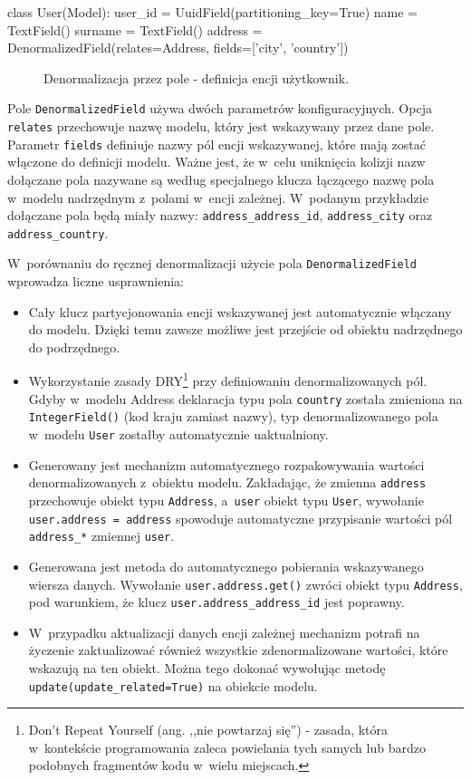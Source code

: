\begin{verbbox}[\footnotesize]
class User(Model):
    user_id = UuidField(partitioning_key=True)
    name = TextField()
    surname = TextField()
    address = DenormalizedField(relates=Address, 
                                fields=['city', 'country'])
\end{verbbox}

\begin{figure}[ht!]
	\centering
	\theverbbox
	\caption{Denormalizacja przez pole - definicja encji użytkownik.}
	\label{lst:denormalization_by_field_example}
\end{figure}

Pole \verb+DenormalizedField+ używa dwóch parametrów konfiguracyjnych. Opcja \verb+relates+ przechowuje nazwę modelu, który jest wskazywany przez dane pole. Parametr \verb+fields+ definiuje nazwy pól encji wskazywanej, które mają zostać włączone do definicji modelu. Ważne jest, że w~celu uniknięcia kolizji nazw dołączane pola nazywane są według specjalnego klucza łączącego nazwę pola w~modelu nadrzędnym z~polami w~encji zależnej. W~podanym przykładzie dołączane pola będą miały nazwy: \verb+address_address_id+, \verb+address_city+ oraz \verb+address_country+.

W~porównaniu do ręcznej denormalizacji użycie pola \verb+DenormalizedField+ wprowadza liczne usprawnienia:

\begin{itemize}
	\item Cały klucz partycjonowania encji wskazywanej jest automatycznie włączany do modelu. Dzięki temu zawsze możliwe jest przejście od obiektu nadrzędnego do podrzędnego.
	\item Wykorzystanie zasady DRY\footnote{Don't Repeat Yourself (ang. ,,nie powtarzaj się'') - zasada, która w~kontekście programowania zaleca powielania tych samych lub bardzo podobnych fragmentów kodu w~wielu miejscach.} przy definiowaniu denormalizowanych pól. Gdyby w~modelu Address deklaracja typu pola \verb+country+ została zmieniona na \verb+IntegerField()+ (kod kraju zamiast nazwy), typ denormalizowanego pola w~modelu \verb+User+ zostałby automatycznie uaktualniony.
	\item Generowany jest mechanizm automatycznego rozpakowywania wartości denormalizowanych z~obiektu modelu. Zakładając, że zmienna \verb+address+ przechowuje obiekt typu \verb+Address+, a~\verb+user+ obiekt typu \verb+User+, wywołanie \verb+user.address = address+ spowoduje automatyczne przypisanie wartości pól \verb+address_*+ zmiennej \verb+user+.
	\item Generowana jest metoda do automatycznego pobierania wskazywanego wiersza danych. Wywołanie \verb+user.address.get()+ zwróci obiekt typu \verb+Address+, pod warunkiem, że klucz \verb+user.address_address_id+ jest poprawny.
	\item W~przypadku aktualizacji danych encji zależnej mechanizm potrafi na życzenie zaktualizować również wszystkie zdenormalizowane wartości, które wskazują na ten obiekt. Można tego dokonać wywołując metodę \verb+update(update_related=True)+ na obiekcie modelu.
\end{itemize}

